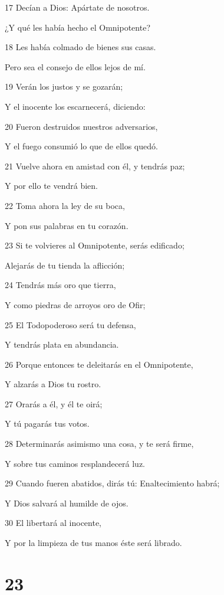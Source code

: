 \par 17 Decían a Dios: Apártate de nosotros.
\par ¿Y qué les había hecho el Omnipotente?
\par 18 Les había colmado de bienes sus casas.
\par Pero sea el consejo de ellos lejos de mí.
\par 19 Verán los justos y se gozarán;
\par Y el inocente los escarnecerá, diciendo:
\par 20 Fueron destruidos nuestros adversarios,
\par Y el fuego consumió lo que de ellos quedó.
\par 21 Vuelve ahora en amistad con él, y tendrás paz;
\par Y por ello te vendrá bien.
\par 22 Toma ahora la ley de su boca,
\par Y pon sus palabras en tu corazón.
\par 23 Si te volvieres al Omnipotente, serás edificado;
\par Alejarás de tu tienda la aflicción;
\par 24 Tendrás más oro que tierra,
\par Y como piedras de arroyos oro de Ofir;
\par 25 El Todopoderoso será tu defensa,
\par Y tendrás plata en abundancia.
\par 26 Porque entonces te deleitarás en el Omnipotente,
\par Y alzarás a Dios tu rostro.
\par 27 Orarás a él, y él te oirá;
\par Y tú pagarás tus votos.
\par 28 Determinarás asimismo una cosa, y te será firme,
\par Y sobre tus caminos resplandecerá luz.
\par 29 Cuando fueren abatidos, dirás tú: Enaltecimiento habrá;
\par Y Dios salvará al humilde de ojos.
\par 30 El libertará al inocente,
\par Y por la limpieza de tus manos éste será librado.

\chapter{23}

